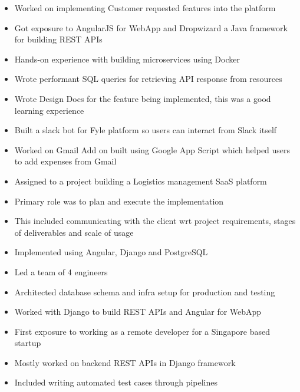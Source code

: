 \documentclass[10pt,a4paper]{altacv}
\begin{document}
\divider\smallskip

\begin{itemize}
\item Worked on implementing Customer requested features into the platform
\item Got exposure to AngularJS for WebApp and Dropwizard a Java framework for building REST APIs
\item Hands-on experience with building microservices using Docker
\item Wrote performant SQL queries for retrieving API response from resources
\item Wrote Design Docs for the feature being implemented, this was a good learning experience
\item Built a slack bot for Fyle platform so users can interact from Slack itself
\item Worked on Gmail Add on built using Google App Script which helped users to add expenses from Gmail
\end{itemize}

\newpage

\begin{itemize}
\item Assigned to a project building a Logistics management SaaS platform
\item Primary role was to plan and execute the implementation
\item This included communicating with the client wrt project requirements, stages of deliverables and scale of usage
\item Implemented using Angular, Django and PostgreSQL
\item Led a team of 4 engineers
\item Architected database schema and infra setup for production and testing
\item Worked with Django to build REST APIs and Angular for WebApp
\end{itemize}

\divider\smallskip

\begin{itemize}
\item First exposure to working as a remote developer for a Singapore based startup
\item Mostly worked on backend REST APIs in Django framework
\item Included writing automated test cases through pipelines
\end{itemize}
\end{document}
